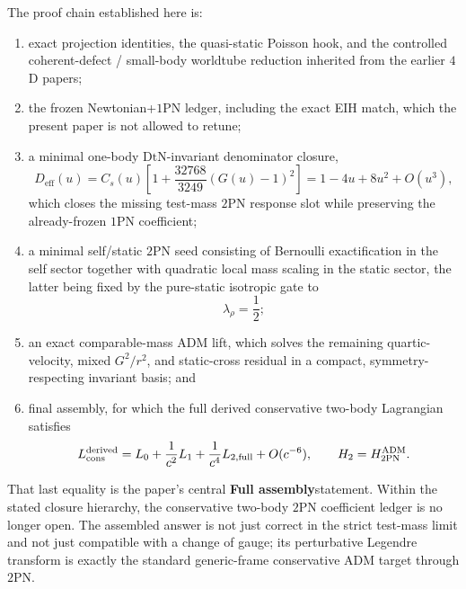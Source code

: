 \documentclass[11pt]{article}
\newcommand{\OnePN}{\mathrm{1PN}}
\newcommand{\TwoPN}{\mathrm{2PN}}
\newcommand{\ADM}{\mathrm{ADM}}
\newcommand{\DtN}{\mathrm{DtN}}
\newcommand{\eff}{\mathrm{eff}}
\newcommand{\FullMatch}{\textbf{Full assembly}}
\begin{document}
The proof chain established here is:
\begin{enumerate}[leftmargin=1.5em]
  \item exact projection identities, the quasi-static Poisson hook, and the
  controlled coherent-defect / small-body worldtube reduction inherited from the
  earlier \(4\)D papers;
  \item the frozen Newtonian+\(\OnePN\) ledger, including the exact EIH match, which
  the present paper is not allowed to retune;
  \item a minimal one-body \(\DtN\)-invariant denominator closure,
  \begin{equation}
  D_{\eff}(u)=C_s(u)\left[1+\frac{32768}{3249}(G(u)-1)^2\right]
  =1-4u+8u^2+O(u^3),
  \label{eq:conclusion-deff}
  \end{equation}
  which closes the missing test-mass \(\TwoPN\) response slot while preserving the
  already-frozen \(\OnePN\) coefficient;
  \item a minimal self/static \(\TwoPN\) seed consisting of Bernoulli exactification in
  the self sector together with quadratic local mass scaling in the static sector,
  the latter being fixed by the pure-static isotropic gate to
  \begin{equation}
  \lambda_\rho=\frac12;
  \label{eq:conclusion-lambda-rho}
  \end{equation}
  \item an exact comparable-mass \(\ADM\) lift, which solves the remaining
  quartic-velocity, mixed \(G^2/r^2\), and static-cross residual in a compact,
  symmetry-respecting invariant basis; and
  \item final assembly, for which the full derived conservative two-body Lagrangian
  satisfies
  \begin{equation}
  L_{\rm cons}^{\rm derived}
  =L_0+\frac{1}{c^2}L_1+\frac{1}{c^4}L_{2,\mathrm{full}}+O(c^{-6}),
  \qquad
  H_2=H_{2\mathrm{PN}}^{\ADM}.
  \label{eq:conclusion-main-match}
  \end{equation}
\end{enumerate}

That last equality is the paper's central \FullMatch statement.
Within the stated closure hierarchy, the conservative two-body \(\TwoPN\) coefficient
ledger is no longer open.
The assembled answer is not just correct in the strict test-mass limit and not just
compatible with a change of gauge; its perturbative Legendre transform is exactly the
standard generic-frame conservative \(\ADM\) target through \(\TwoPN\).
\end{document}
